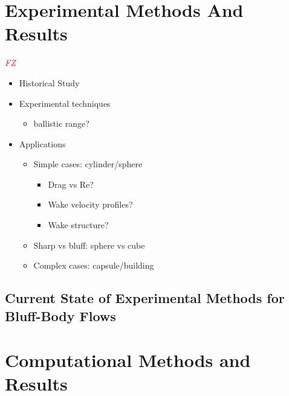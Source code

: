 \documentclass[journal]{new-aiaa}
\begin{document}
\section{Experimental Methods And Results} \label{sec:experimentalmethods}

\textcolor{red}{\emph{FZ}}

\begin{itemize}
    \item Historical Study
    \item Experimental techniques
    \begin{itemize}
        \item ballistic range?
    \end{itemize}
    \item Applications
    \begin{itemize}
        \item Simple cases: cylinder/sphere
        \begin{itemize}
            \item Drag vs Re?
            \item Wake velocity profiles?
            \item Wake structure?
        \end{itemize}
        \item Sharp vs bluff: sphere vs cube
        \item Complex cases: capsule/building
    \end{itemize}
\end{itemize}








\subsection{Current State of Experimental Methods for Bluff-Body Flows} \label{subsec:currentstateexperimental}













\section{Computational Methods and Results} \label{sec:computationalmethods}
\end{document}
